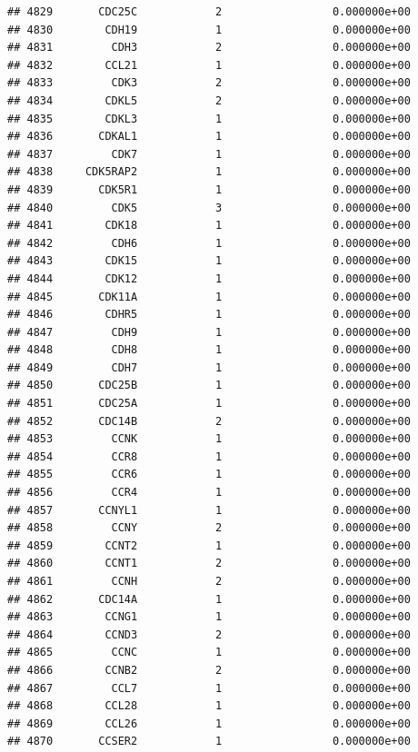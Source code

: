 \documentclass[
]{article}
\begin{document}
\begin{verbatim}
## 4829       CDC25C            2                 0.000000e+00
## 4830        CDH19            1                 0.000000e+00
## 4831         CDH3            2                 0.000000e+00
## 4832        CCL21            1                 0.000000e+00
## 4833         CDK3            2                 0.000000e+00
## 4834        CDKL5            2                 0.000000e+00
## 4835        CDKL3            1                 0.000000e+00
## 4836       CDKAL1            1                 0.000000e+00
## 4837         CDK7            1                 0.000000e+00
## 4838     CDK5RAP2            1                 0.000000e+00
## 4839       CDK5R1            1                 0.000000e+00
## 4840         CDK5            3                 0.000000e+00
## 4841        CDK18            1                 0.000000e+00
## 4842         CDH6            1                 0.000000e+00
## 4843        CDK15            1                 0.000000e+00
## 4844        CDK12            1                 0.000000e+00
## 4845       CDK11A            1                 0.000000e+00
## 4846        CDHR5            1                 0.000000e+00
## 4847         CDH9            1                 0.000000e+00
## 4848         CDH8            1                 0.000000e+00
## 4849         CDH7            1                 0.000000e+00
## 4850       CDC25B            1                 0.000000e+00
## 4851       CDC25A            1                 0.000000e+00
## 4852       CDC14B            2                 0.000000e+00
## 4853         CCNK            1                 0.000000e+00
## 4854         CCR8            1                 0.000000e+00
## 4855         CCR6            1                 0.000000e+00
## 4856         CCR4            1                 0.000000e+00
## 4857       CCNYL1            1                 0.000000e+00
## 4858         CCNY            2                 0.000000e+00
## 4859        CCNT2            1                 0.000000e+00
## 4860        CCNT1            2                 0.000000e+00
## 4861         CCNH            2                 0.000000e+00
## 4862       CDC14A            1                 0.000000e+00
## 4863        CCNG1            1                 0.000000e+00
## 4864        CCND3            2                 0.000000e+00
## 4865         CCNC            1                 0.000000e+00
## 4866        CCNB2            2                 0.000000e+00
## 4867         CCL7            1                 0.000000e+00
## 4868        CCL28            1                 0.000000e+00
## 4869        CCL26            1                 0.000000e+00
## 4870       CCSER2            1                 0.000000e+00

\end{verbatim}
\end{document}
